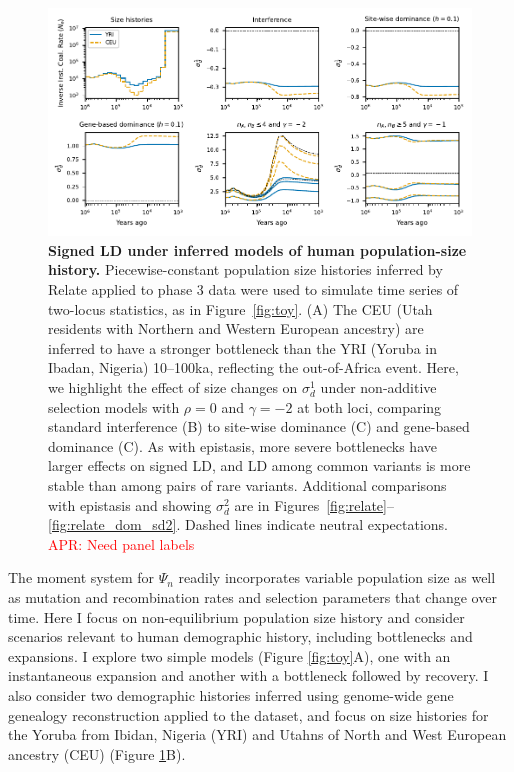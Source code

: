 \documentclass[]{article}
\newcommand{\comment}[1]{{\textcolor{red}{APR: #1}}}
\begin{document}
\begin{figure}[tb!]
    \centering
    \includegraphics{../figures/demog_YRI_CEU.dominance}
    \caption{
        \textbf{Signed LD under inferred models of human population-size history.}
        Piecewise-constant population size histories inferred by Relate applied to
        \citet{1000_Genomes_Project_Consortium2015-zq} phase 3 data were used to
        simulate time series of two-locus statistics, as in Figure~\ref{fig:toy}.
        (A) The CEU (Utah residents with Northern and Western European ancestry)
        are inferred to have a stronger bottleneck than the YRI
        (Yoruba in Ibadan, Nigeria) 10--100ka, reflecting the out-of-Africa
        event.
        Here, we highlight the effect of size changes on \(\sigma_d^1\) under
        non-additive selection models with \(\rho=0\) and \(\gamma=-2\) at both loci,
        comparing standard interference (B) to site-wise dominance (C) and gene-based
        dominance (C).
        As with epistasis, more severe bottlenecks have larger effects on signed LD,
        and LD among common variants is more stable than among pairs of rare variants.
        Additional comparisons with epistasis and showing \(\sigma_d^2\) are
        in Figures~\ref{fig:relate}--\ref{fig:relate_dom_sd2}.
        Dashed lines indicate neutral expectations.
        \comment{Need panel labels}
    }
    \label{fig:relate_dom}
\end{figure}

The moment system for \(\Psi_n\) readily incorporates variable population size as
well as mutation and recombination rates and selection parameters that change
over time. Here I focus on non-equilibrium population size history and consider
scenarios relevant to human demographic history, including bottlenecks and
expansions. I explore two simple models (Figure \ref{fig:toy}A), one with an
instantaneous expansion and another with a bottleneck followed by recovery. I
also consider two demographic histories inferred using genome-wide gene
genealogy reconstruction \citep{Speidel2019-nj} applied to the
\citet{1000_Genomes_Project_Consortium2015-zq} dataset, and focus on size histories
for the Yoruba from Ibidan, Nigeria (YRI) and Utahns of North and West European
ancestry (CEU) (Figure \ref{fig:relate_dom}B).
\end{document}
